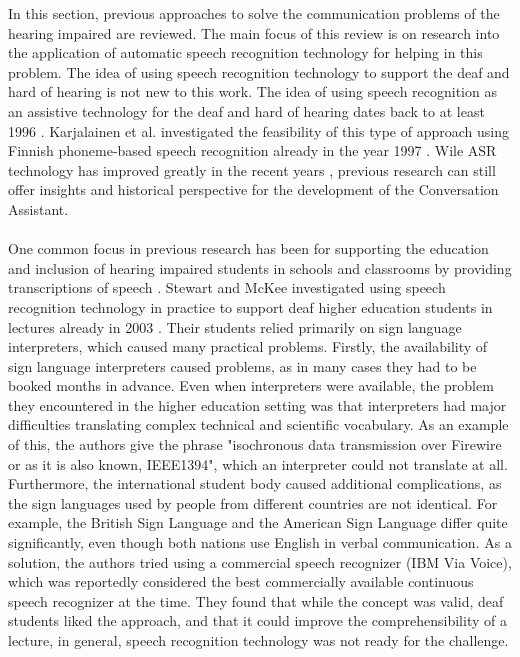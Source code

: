 \documentclass[english, 12pt, a4paper, pdftex, elec, utf8]{aaltothesis}
\begin{document}
In this section, previous approaches to solve the communication problems of the hearing impaired are reviewed. The main focus of this review is on research into the application of automatic speech recognition technology for helping in this problem. The idea of using speech recognition technology to support the deaf and hard of hearing is not new to this work. The idea of using speech recognition as an assistive technology for the deaf and hard of hearing dates back to at least 1996 \cite{robison1996computer}. Karjalainen et al. investigated the feasibility of this type of approach using Finnish phoneme-based speech recognition already in the year 1997 \cite{karjalainen1997applications}. Wile ASR technology has improved greatly in the recent years \cite{yu2014automatic}, previous research can still offer insights and historical perspective for the development of the Conversation Assistant. \\\\
One common focus in previous research has been for supporting the education and inclusion of hearing impaired students in schools and classrooms by providing transcriptions of speech \cite{kheir2007inclusion, stewart2003application, fen2010using, jun2010exploration, jimenez2011tablet, ranchal2013using, kawas2016improving}. Stewart and McKee investigated using speech recognition technology in practice to support deaf higher education students in lectures already in 2003 \cite{stewart2003application}. Their students relied primarily on sign language interpreters, which caused many practical problems. Firstly, the availability of sign language interpreters caused problems, as in many cases they had to be booked months in advance. Even when interpreters were available, the problem they encountered in the higher education setting was that interpreters had major difficulties translating complex technical and scientific vocabulary. As an example of this, the authors give the phrase "isochronous data transmission over Firewire or as it is also known, IEEE1394", which an interpreter could not translate at all. Furthermore, the international student body caused additional complications, as the sign languages used by people from different countries are not identical. For example, the British Sign Language and the American Sign Language differ quite significantly, even though both nations use English in verbal communication. As a solution, the authors tried using a commercial speech recognizer (IBM Via Voice), which was reportedly considered the best commercially available continuous speech recognizer at the time. They found that while the concept was valid, deaf students liked the approach, and that it could improve the comprehensibility of a lecture, in general, speech recognition technology was not ready for the challenge. \\\\
\end{document}
